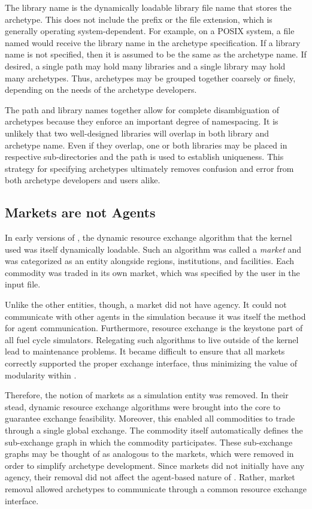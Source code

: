 The library name is the dynamically loadable library file name that stores the 
archetype. This does not include the  prefix or the file extension, 
which is generally operating system-dependent.  For example, on a
POSIX system,
a file named  would receive the library name 
in the archetype specification. 
If a library name is not specified, then it is assumed to be the same as the 
archetype name.
If desired, a single path may hold many libraries and a single library may hold
many archetypes. Thus, archetypes may be grouped
together coarsely or finely, depending on the needs of the archetype developers.

The path and library names together allow for complete disambiguation of 
archetypes because they enforce an important degree of namespacing.  It is unlikely
that two well-designed libraries will overlap in both library and archetype name.
Even if they overlap, one or both libraries may be placed in respective
sub-directories and the path is used to establish uniqueness.
This strategy for specifying archetypes ultimately removes confusion and error from 
both archetype developers and users alike.

\subsection{Markets are not Agents}

In early versions of \cyclus, the dynamic resource exchange algorithm that the 
kernel used was itself dynamically loadable. Such an algorithm was called a
\emph{market} and was categorized as an entity alongside regions,
institutions, and facilities. 
Each commodity was traded in its own market, which was specified by 
the user in the input file.

Unlike the other entities, though, a market did not have agency.  It could not 
communicate with other agents in the simulation because it was itself the method
for agent communication.  Furthermore, resource exchange is the keystone
part of all fuel cycle simulators. 
Relegating such algorithms to live outside of 
the kernel lead to maintenance problems. It became difficult to 
ensure that all markets correctly supported the proper exchange interface,
thus minimizing the value of modularity within \cyclus.

Therefore, the notion of markets as a simulation entity was removed. In their 
stead, dynamic resource exchange algorithms were brought into the core to
guarantee exchange feasibility. Moreover, this enabled all commodities to trade 
through a single global exchange. The commodity itself automatically defines 
the sub-exchange graph in which the commodity participates.
These sub-exchange graphs may be thought of as analogous to the 
markets, which were removed in order to simplify archetype development.
Since markets did not initially have any agency, their removal did not 
affect the agent-based
nature of \cyclus.  Rather, market removal allowed archetypes to 
communicate through a common resource exchange interface.

